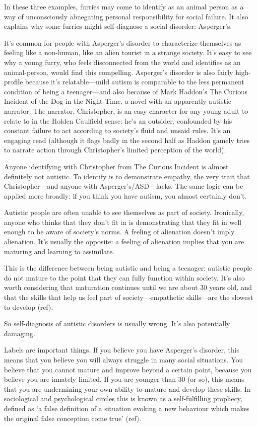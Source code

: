 In these three examples, furries may come to identify as an animal person as a way of unconsciously abnegating personal responsibility for social failure. It also explains why some furries might self-diagnose a social disorder: Asperger's.

It's common for people with Asperger's disorder to characterize themselves as feeling like a non-human, like an alien tourist in a strange society. It's easy to see why a young furry, who feels disconnected from the world and identifies as an animal-person, would find this compelling. Asperger's disorder is also fairly high-profile because it's relatable—mild autism is comparable to the less permanent condition of being a teenager—and also because of Mark Haddon's The Curious Incident of the Dog in the Night-Time, a novel with an apparently autistic narrator. The narrator, Christopher, is an easy character for any young adult to relate to in the Holden Caulfield sense: he's an outsider, confounded by his constant failure to act according to society's fluid and unsaid rules. It's an engaging read (although it flags badly in the second half as Haddon gamely tries to narrate action through Christopher's limited perception of the world).

Anyone identifying with Christopher from The Curious Incident is almost definitely not autistic. To identify is to demonstrate empathy, the very trait that Christopher—and anyone with Asperger's/ASD—lacks. The same logic can be applied more broadly: if you think you have autism, you almost certainly don't.

Autistic people are often unable to see themselves as part of society. Ironically, anyone who thinks that they don't fit in is demonstrating that they fit in well enough to be aware of society's norms. A feeling of alienation doesn't imply alienation. It's usually the opposite: a feeling of alienation implies that you are maturing and learning to assimilate.

This is the difference between being autistic and being a teenager: autistic people do not mature to the point that they can fully function within society. It's also worth considering that maturation continues until we are about 30 years old, and that the skills that help us feel part of society—empathetic skills—are the slowest to develop (ref).

So self-diagnosis of autistic disorders is usually wrong. It's also potentially damaging.

Labels are important things. If you believe you have Asperger's disorder, this means that you believe you will always struggle in many social situations. You believe that you cannot mature and improve beyond a certain point, because you believe you are innately limited. If you are younger than 30 (or so), this means that you are undermining your own ability to mature and develop these skills. In sociological and psychological circles this is known as a self-fulfilling prophecy, defined as `a false definition of a situation evoking a new behaviour which makes the original false conception come true' (ref).

